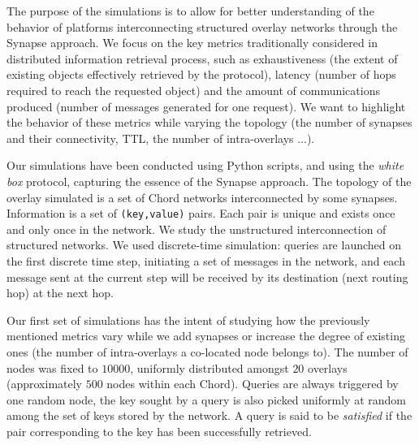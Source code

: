The purpose of the simulations is to allow for better understanding of
the behavior of platforms interconnecting structured overlay networks
through the Synapse approach. We focus on the key metrics
traditionally considered in distributed information retrieval process,
such as exhaustiveness (the extent of existing objects effectively
retrieved by the protocol), latency (number of hops required to reach
the requested object) and the amount of communications produced
(number of messages generated for one request). We want to highlight
the behavior of these metrics while varying the topology (the number
of synapses and their connectivity, TTL, the number of intra-overlays
...).

%
%
Our simulations have been conducted using Python scripts, and using
the \emph{white box} protocol, capturing the essence of the Synapse
approach. The topology of the overlay simulated is a set of Chord
networks interconnected by some synapses.  Information is a set of
{\tt (key,value)} pairs. Each pair is unique and exists once and only
once in the network. We study the unstructured interconnection of
structured networks. We used discrete-time simulation: queries are
launched on the first discrete time step, initiating a set of messages
in the network, and each message sent at the current step will be
received by its destination (next routing hop) at the next hop.

%
%
Our first set of simulations has the intent of studying how the
previously mentioned metrics vary while we add synapses or increase
the degree of existing ones (the number of intra-overlays a co-located
node belongs to). The number of nodes was fixed to $10000$, uniformly
distributed amongst $20$ overlays (approximately $500$ nodes within
each Chord). Queries are always triggered by one random node, the key
sought by a query is also picked uniformly at random among the set of
keys stored by the network. A query is said to be \emph{satisfied} if
the pair corresponding to the key has been successfully retrieved.


